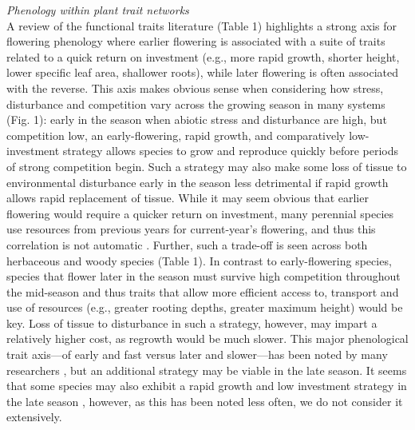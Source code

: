 \documentclass[11pt,a4paper,oneside]{article}
\begin{document}
\noindent \emph{Phenology within plant trait networks}\\
\noindent A review of the functional traits literature (Table 1) highlights a strong axis for flowering phenology where earlier flowering is associated with a suite of traits related to a quick return on investment (e.g., more rapid growth, shorter height, lower specific leaf area, shallower roots), while later flowering is often associated with the reverse. This axis makes obvious sense when considering how stress, disturbance and competition vary across the growing season in many systems (Fig. 1): early in the season when abiotic stress and disturbance are high, but competition low, an early-flowering, rapid growth, and comparatively low-investment strategy allows species to grow and reproduce quickly before periods of strong competition begin. Such a strategy may also make some loss of tissue to environmental disturbance early in the season less detrimental if rapid growth allows rapid replacement of tissue. While it may seem obvious that earlier flowering would require a quicker return on investment, many perennial species use resources from previous years for current-year's flowering, and thus this correlation is not automatic \citep{muller1978}. Further, such a trade-off is seen across both herbaceous and woody species (Table 1). In contrast to early-flowering species, species that flower later in the season must survive high competition throughout the mid-season and thus traits that allow more efficient access to, transport and use of resources (e.g., greater rooting depths, greater maximum height) would be key. Loss of tissue to disturbance in such a strategy, however, may impart a relatively higher cost, as regrowth would be much slower. This major phenological trait axis---of early and fast versus later and slower---has been noted by many researchers \citep[e.g.,][]{Lechowicz:1984cr,Sun:2011eu}, but an additional strategy may be viable in the late season. It seems that some species may also exhibit a rapid growth and low investment strategy in the late season \citep{Sun:2011eu}, however, as this has been noted less often, we do not consider it extensively.
\end{document}

